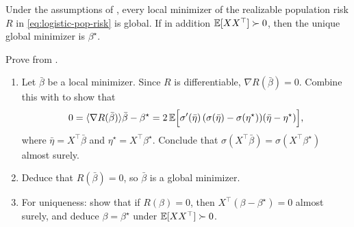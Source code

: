 \documentclass[11pt]{article}
\newif\ifshowsolutions
\newcommand{\SolutionBox}[2][10]{%
  \ifshowsolutions
    \begin{tcolorbox}[stat221panelgray,title={Solution}]
    #2
    \end{tcolorbox}
  \else
    \begin{tcolorbox}[stat221panelgray,unbreakable,title={Workspace}]
    \vspace{#1\baselineskip}
    \end{tcolorbox}
  \fi
}
\begin{document}
\SolutionBox[14]{%
\emph{Part (1).}
Differentiate \eqref{eq:logistic-pop-risk} under the expectation:
\[
R(\beta)=\E\big[(\sigma(X^\top\beta)-\sigma(X^\top\beta^\star))^2\big].
\]
Using the chain rule, $\nabla_\beta\sigma(X^\top\beta)=\sigma'(X^\top\beta)\,X$, hence
\[
\nabla R(\beta)
=2\,\E\Big[(\sigma(\eta)-\sigma(\eta^\star))\,\sigma'(\eta)\,X\Big],
\qquad
\eta=X^\top\beta,\ \eta^\star=X^\top\beta^\star.
\]

\emph{Part (2).}
Take the inner product with $(\beta-\beta^\star)$ and use $\ip{X}{\beta-\beta^\star}=\eta-\eta^\star$:
\[
\ip{\nabla R(\beta)}{\beta-\beta^\star}
=2\,\E\Big[\sigma'(\eta)\,(\sigma(\eta)-\sigma(\eta^\star))(\eta-\eta^\star)\Big].
\]
Since $\sigma'(\eta)\ge 0$ and $\sigma$ is increasing, we have
$(\sigma(\eta)-\sigma(\eta^\star))(\eta-\eta^\star)\ge 0$ pointwise.
Therefore the integrand is pointwise nonnegative, and the expectation is nonnegative as claimed.

\emph{Part (3) (ray monotonicity).}
For the ray $\beta(t)=\beta^\star+t(\beta-\beta^\star)$, define $g(t)=R(\beta(t))$.
By the chain rule,
\[
g'(t)=\ip{\nabla R(\beta(t))}{\beta-\beta^\star}\ge 0,
\]
so $t\mapsto R(\beta(t))$ is nondecreasing for $t\ge 0$.
(The argument uses only that the link is increasing with nonnegative derivative, so it holds for any such link function.)%
}

\begin{corollary}
\label{cor:logistic-pop-no-spurious}
Under the assumptions of , every local minimizer of the realizable population risk $R$ in \eqref{eq:logistic-pop-risk} is global.
If in addition $\mathbb{E}[XX^\top]\succ 0$, then the unique global minimizer is $\beta^\star$.
\end{corollary}

\begin{exercise}
\label{ex:logistic-one-point-no-spurious}
Prove  from .
\begin{enumerate}[leftmargin=*]
  \item Let $\bar\beta$ be a local minimizer. Since $R$ is differentiable, $\nabla R(\bar\beta)=0$.
  Combine this with  to show that
  \[
    0
    = \langle\nabla R(\bar\beta)\rangle{\bar\beta-\beta^\star}
    = 2\,\mathbb{E}\Big[\sigma'(\bar\eta)\,(\sigma(\bar\eta)-\sigma(\eta^\star))(\bar\eta-\eta^\star)\Big],
  \]
  where $\bar\eta=X^\top\bar\beta$ and $\eta^\star=X^\top\beta^\star$.
  Conclude that $\sigma(X^\top\bar\beta)=\sigma(X^\top\beta^\star)$ almost surely.
  \item Deduce that $R(\bar\beta)=0$, so $\bar\beta$ is a global minimizer.
  \item For uniqueness: show that if $R(\beta)=0$, then $X^\top(\beta-\beta^\star)=0$ almost surely, and deduce $\beta=\beta^\star$ under $\mathbb{E}[XX^\top]\succ 0$.
\end{enumerate}
\end{exercise}
\end{document}

